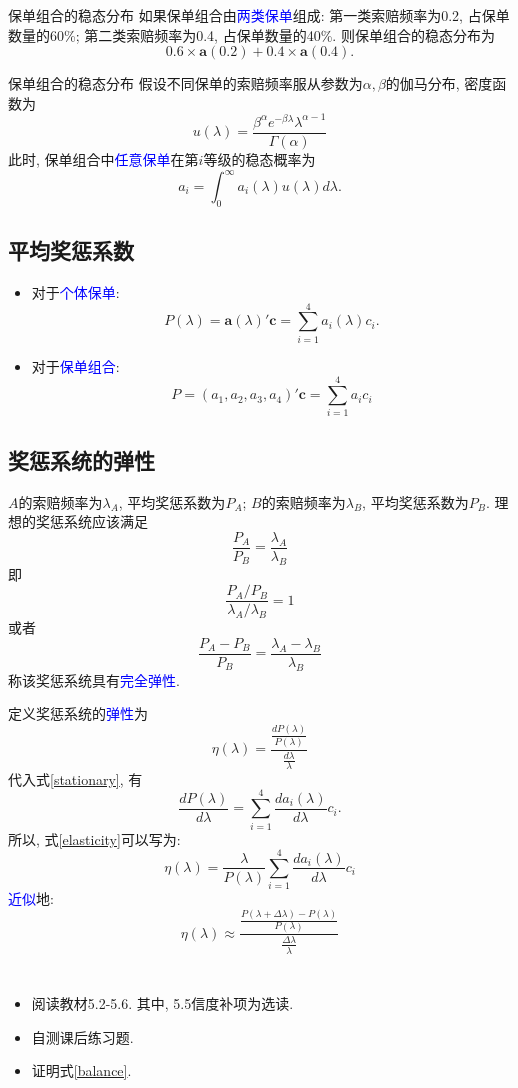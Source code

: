\documentclass[professionalfont]{beamer}
\def\ba{\boldsymbol{a}}
\def\bc{\boldsymbol{c}}
\newcommand{\blue}[1]{\textcolor{blue}{#1}}
\begin{document}
\begin{frame}{保单组合的稳态分布}
如果保单组合由\blue{两类保单}组成:  第一类索赔频率为0.2, 占保单数量的60\%;  第二类索赔频率为0.4, 占保单数量的40\%. 则保单组合的稳态分布为
$$0.6\times\ba(0.2)+0.4\times\ba(0.4).$$
\end{frame}

\begin{frame}{保单组合的稳态分布}
假设不同保单的索赔频率服从参数为$\alpha,\beta$的伽马分布, 密度函数为
$$u(\lambda)=\frac{\beta^\alpha e^{-\beta\lambda}\lambda^{\alpha-1}}{\Gamma(\alpha)}$$
此时, 保单组合中\blue{任意保单}在第$i$等级的稳态概率为
$$a_i=\int_{0}^{\infty}a_i(\lambda)u(\lambda)d\lambda.$$
\end{frame}
\subsection{平均奖惩系数}
\begin{frame}
\begin{itemize}
\item 对于\blue{个体保单}: 
\begin{equation}\label{stationary}
P(\lambda)=\ba(\lambda)'\bc=\sum_{i=1}^4 a_i(\lambda)c_i.
\end{equation}
\item 对于\blue{保单组合}: $$P=(a_1,a_2,a_3,a_4)'\bc=\sum_{i=1}^4 a_ic_i$$
\end{itemize}
\end{frame}
\subsection{奖惩系统的弹性}
\begin{frame}
$A$的索赔频率为$\lambda_A$, 平均奖惩系数为$P_A$;  $B$的索赔频率为$\lambda_B$, 平均奖惩系数为$P_B$. 理想的奖惩系统应该满足
$$\frac{P_A}{P_B}=\frac{\lambda_A}{\lambda_B}$$
即
$$\frac{P_A/P_B}{\lambda_A/\lambda_B}=1$$
或者
$$\frac{P_A-P_B}{P_B}=\frac{\lambda_A-\lambda_B}{\lambda_B}$$
称该奖惩系统具有\blue{完全弹性}.
\end{frame}
\begin{frame}
定义奖惩系统的\blue{弹性}为
\begin{equation}\label{elasticity}
\eta(\lambda)=\frac{\frac{d P(\lambda)}{P(\lambda)}}{\frac{d\lambda}{\lambda}}
\end{equation}
代入式\eqref{stationary}, 有
$$\frac{d P(\lambda)}{d\lambda}=\sum_{i=1}^{4}\frac{da_i(\lambda)}{d\lambda}c_i.$$
所以, 式\eqref{elasticity}可以写为:
\begin{equation}
\eta(\lambda)=\frac{\lambda}{P(\lambda)}\sum_{i=1}^{4}\frac{da_i(\lambda)}{d\lambda}c_i
\end{equation}
\blue{近似}地:
$$\eta(\lambda)\approx \frac{\frac{P(\lambda+\Delta\lambda)-P(\lambda)}{P(\lambda)}}{\frac{\Delta \lambda}{\lambda}}$$
\end{frame}

\section*{}
\begin{frame}
\begin{itemize}
\item 阅读教材5.2-5.6. 其中, 5.5信度补项为选读.
\item 自测课后练习题.
\item 证明式\eqref{balance}.
\end{itemize}
\end{frame}
\end{document}
